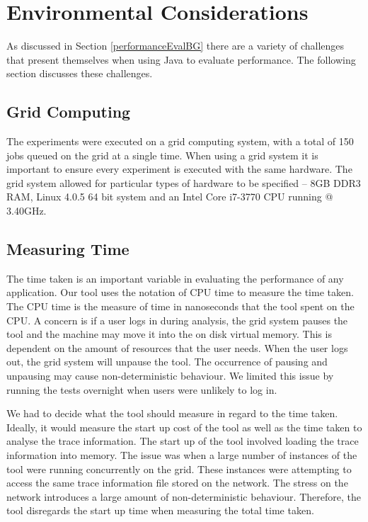 \section{Environmental Considerations}
\label{enviro}
As discussed in Section \ref{performanceEvalBG} there are a variety of challenges that present themselves when using Java to evaluate performance. The following section discusses these challenges.

\subsection{Grid Computing}
The experiments were executed on a grid computing system, with a total of 150 jobs queued on the grid at a single time. When using a grid system it is important to ensure every experiment is executed with the same hardware. The grid system allowed for particular types of hardware to be specified -- 8GB DDR3 RAM, Linux 4.0.5 64 bit system and an Intel Core i7-3770 CPU running @ 3.40GHz.

\subsection{Measuring Time }
The time taken is an important variable in evaluating the performance of any application. Our tool uses the notation of CPU time to measure the time taken. The CPU time is the measure of time in nanoseconds that the tool spent on the CPU. A concern is if a user logs in during analysis, the grid system pauses the tool and the machine may move it into the on disk virtual memory. This is dependent on the amount of resources that the user needs. When the user logs out, the grid system will unpause the tool. The occurrence of pausing and unpausing may cause non-deterministic behaviour.  We limited this issue by running the tests overnight when users were unlikely to log in.

We had to decide what the tool should measure in regard to the time taken. Ideally, it would measure the start up cost of the tool as well as the time taken to analyse the trace information. The start up of the tool involved loading the trace information into memory. The issue was when a large number of instances of the tool were running concurrently on the grid. These instances were attempting to access the same trace information file stored on the network. The stress on the network introduces a large amount of non-deterministic behaviour. Therefore, the tool disregards the start up time when measuring the total time taken.

